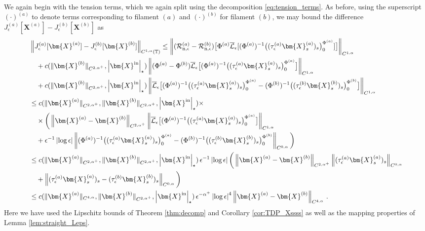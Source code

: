 \documentclass[11pt,reqno]{amsart}
\newcommand{\T}{\mathbb{T}}
\newcommand{\X}{\bm{X}}
\newcommand{\abs}[1]{\left\lvert #1 \right\rvert}
\newcommand{\norm}[1]{\left\lVert #1 \right\rVert}
\newcommand{\mc}[1]{\mathcal{#1}}
\theoremstyle{definition}
\begin{document}
We again begin with the tension terms, which we again split using the decomposition \eqref{eq:tension_terms}. As before, using the superscript $(\cdot)^{(a)}$ to denote terms corresponding to filament $(a)$ and $(\cdot)^{(b)}$ for filament $(b)$, we may bound the difference $J_\epsilon^{(a)}[\X^{(a)}]-J_\epsilon^{(b)}[\X^{(b)}]$ as
\begin{equation}\label{eq:Jeps_lip}
\begin{aligned}
  &\norm{J_\epsilon^{(a)}[\X^{(a)}]-J_\epsilon^{(b)}[\X^{(b)}]}_{C^{1,\alpha}(\T)} 
  \le \norm{(\mc{R}_{\rm n,\epsilon}^{(a)}-\mc{R}_{\rm n,\epsilon}^{(b)})\big[\Phi^{(a)}\overline{\mc{L}}_\epsilon[(\Phi^{(a)})^{-1}\big((\tau_\epsilon^{(a)}\X_s^{(a)})_s \big)_0^{\Phi^{(a)}}] \big]}_{C^{1,\alpha}}\\
  &\quad + c(\|\X^{(b)}\|_{C^{2,\alpha^+}},\abs{\X^{\rm in}}_\star)\norm{(\Phi^{(a)}-\Phi^{(b)})\overline{\mc{L}}_\epsilon\big[(\Phi^{(a)})^{-1}\big((\tau_\epsilon^{(a)}\X_s^{(a)})_s \big)_0^{\Phi^{(a)}}\big]}_{C^{1,\alpha}}\\
  &\quad + c(\|\X^{(b)}\|_{C^{2,\alpha^+}},\abs{\X^{\rm in}}_\star)\norm{\overline{\mc{L}}_\epsilon\big[(\Phi^{(a)})^{-1}\big((\tau_\epsilon^{(a)}\X_s^{(a)})_s \big)_0^{\Phi^{(a)}}- (\Phi^{(b)})^{-1}\big((\tau_\epsilon^{(b)}\X_s^{(b)})_s \big)_0^{\Phi^{(b)}}\big]}_{C^{1,\alpha}}\\
  &\le c(\|\X^{(a)}\|_{C^{2,\alpha^+}},\|\X^{(b)}\|_{C^{2,\alpha^+}},\abs{\X^{\rm in}}_\star)\times\\
  &\quad \times \bigg(\norm{\X^{(a)}-\X^{(b)}}_{C^{2,\alpha^+}}\norm{\overline{\mc{L}}_\epsilon\big[(\Phi^{(a)})^{-1}\big((\tau_\epsilon^{(a)}\X_s^{(a)})_s \big)_0^{\Phi^{(a)}}\big]}_{C^{1,\alpha}}\\
  &\quad + \epsilon^{-1}\abs{\log\epsilon}\norm{(\Phi^{(a)})^{-1}\big((\tau_\epsilon^{(a)}\X_s^{(a)})_s \big)_0^{\Phi^{(a)}}- (\Phi^{(b)})^{-1}\big((\tau_\epsilon^{(b)}\X_s^{(b)})_s \big)_0^{\Phi^{(b)}}}_{C^{0,\alpha}}\bigg) \\
  & \le c(\|\X^{(a)}\|_{C^{2,\alpha^+}},\|\X^{(b)}\|_{C^{2,\alpha^+}},\abs{\X^{\rm in}}_\star)\,\epsilon^{-1}\abs{\log\epsilon}\bigg(\norm{\X^{(a)}-\X^{(b)}}_{C^{2,\alpha^+}}\norm{(\tau_\epsilon^{(a)}\X_s^{(a)})_s }_{C^{0,\alpha}}\\
  &\quad + \norm{(\tau_\epsilon^{(a)}\X_s^{(a)})_s -(\tau_\epsilon^{(b)}\X_s^{(b)})_s }_{C^{0,\alpha}}\bigg)\\
  & \le c(\|\X^{(a)}\|_{C^{4,\alpha}},\|\X^{(b)}\|_{C^{2,\alpha^+}},\abs{\X^{\rm in}}_\star)\,\epsilon^{-\alpha^+}\abs{\log\epsilon}^4\norm{\X^{(a)}-\X^{(b)}}_{C^{4,\alpha}}\,.
\end{aligned}
\end{equation}
Here we have used the Lipschitz bounds of Theorem \ref{thm:decomp} and Corollary \ref{cor:TDP_Xssss} as well as the mapping properties of Lemma \ref{lem:straight_Leps}.
\end{document}

